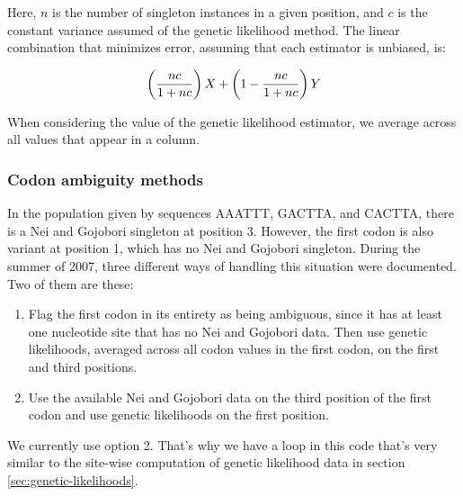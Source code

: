\documentclass{article}
\begin{document}
	Here, $n$ is the number of singleton instances in a given position, and
	$c$ is the constant variance assumed of the genetic likelihood method.
	The linear combination that minimizes error, assuming that each
	estimator is unbiased, is:

	$$ \left( {nc \over 1 + nc} \right) X + \left (1 - {nc \over 1 +
	    nc}\right) Y $$

	When considering the value of the genetic likelihood estimator, we
	average across all values that appear in a column.

      \subsubsection{Codon ambiguity methods}
	\label{sec:codon-ambiguity}

	In the population given by sequences AAATTT, GACTTA, and CACTTA,
	there is a Nei and Gojobori singleton at position 3. However, the first codon
	is also variant at position 1, which has no Nei and Gojobori singleton.
	During the summer of 2007, three different ways of handling this situation were
	documented. Two of them are these:

	\begin{enumerate}
	  \item Flag the first codon in its entirety as being ambiguous, since
	  it has at least one nucleotide site that has no Nei and Gojobori data.
	  Then use genetic likelihoods, averaged across all codon values in the
	  first codon, on the first and third positions.

	  \item Use the available Nei and Gojobori data on the third position of
	  the first codon and use genetic likelihoods on the first position.
	\end{enumerate}

	We currently use option 2. That's why we have a loop in this code that's
	very similar to the site-wise computation of genetic likelihood data in
	section \ref{sec:genetic-likelihoods}.
\end{document}
